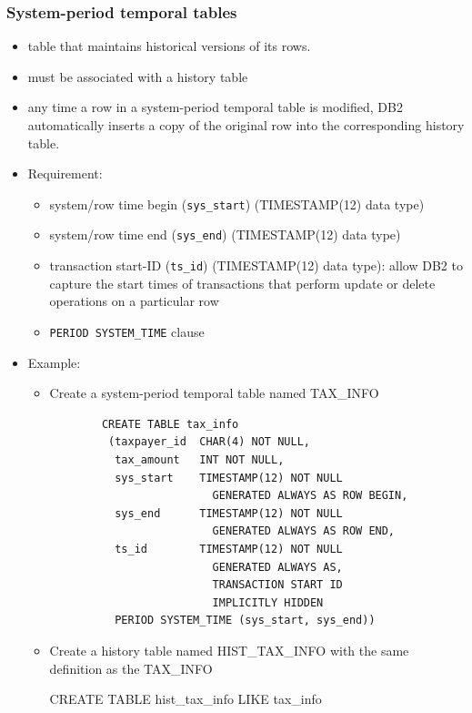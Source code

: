 \documentclass{article}
\begin{document}
\subsubsection{System-period temporal tables}
\begin{itemize}
\item table that maintains historical versions of its rows. 
\item must be associated with a history table
\item any time a row in a system-period temporal table is modified, DB2 automatically inserts a copy of
the original row into the corresponding history table.
\item Requirement:
	\begin{itemize}
		\item system/row time begin (\texttt{sys\_start}) (TIMESTAMP(12) data type)
		\item system/row time end (\texttt{sys\_end}) (TIMESTAMP(12) data type)
		\item transaction start-ID (\texttt{ts\_id}) (TIMESTAMP(12) data type): allow DB2 to capture the start times of transactions that perform update or delete operations on a particular row
		\item \texttt{PERIOD SYSTEM\_TIME} clause
	\end{itemize}
\item Example:
	\begin{itemize}
	\item Create a system-period temporal table named TAX\_INFO
    \begin{verbatim}
		CREATE TABLE tax_info
		 (taxpayer_id  CHAR(4) NOT NULL,
		  tax_amount   INT NOT NULL,
		  sys_start    TIMESTAMP(12) NOT NULL
						 GENERATED ALWAYS AS ROW BEGIN,
		  sys_end      TIMESTAMP(12) NOT NULL
						 GENERATED ALWAYS AS ROW END,
		  ts_id        TIMESTAMP(12) NOT NULL
						 GENERATED ALWAYS AS,
						 TRANSACTION START ID
						 IMPLICITLY HIDDEN
		  PERIOD SYSTEM_TIME (sys_start, sys_end))
    \end{verbatim}
    
    \item Create a history table named HIST\_TAX\_INFO with the same definition as the TAX\_INFO
    \begin{sqlcode}
    CREATE TABLE hist_tax_info LIKE tax_info
    \end{sqlcode}
    

\end{itemize}
\end{itemize}
\end{document}
